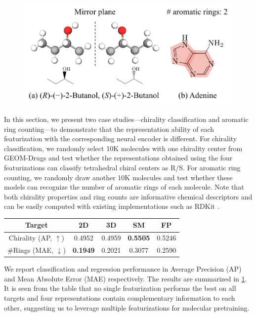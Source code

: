	\setlength{\intextsep}{3pt}
\begin{figure}
	\centering
	\includegraphics[width=\linewidth,bb=0 0 415 201]{figures/case-study.pdf}
\end{figure}
In this section, we present two case studies---chirality classification and aromatic ring counting---to demonstrate that the representation ability of each featurization with the corresponding neural encoder is different.
For chirality classification, we randomly select 10K molecules with one chirality center from GEOM-Drugs \cite{Axelrod:2022da} and test whether the representations obtained using the four featurizations can classify tetrahedral chiral centers as R/S.
For aromatic ring counting, we randomly draw another 10K molecules and test whether these models can recognize the number of aromatic rings of each molecule.
Note that both chirality properties and ring counts are informative chemical descriptors \cite{Ritchie:2009ti} and can be easily computed with existing implementations such as RDKit \cite{Landrum:2022rd}.

\begin{table}
	\begin{tabular}{ccccc}
	\toprule
	Target & 2D & 3D & SM & FP \\
	\midrule
	Chirality (AP, \(\uparrow\)) &   0.4952    &    0.4959   &    \textbf{0.5505}   & 0.5246 \\
	\#Rings (MAE, \(\downarrow\)) &   \textbf{0.1949}    &   0.2021    &   0.3077    & 0.2590 \\
	\bottomrule
	\end{tabular}
	\label{tab:case-studies}
\end{table}
We report classification and regression performance in Average Precision (AP) and Mean Absolute Error (MAE) respectively. The results are summarized in \cref{tab:case-studies}. 
It is seen from the table that no single featurization performs the best on all targets and four representations contain complementary information to each other, suggesting us to leverage multiple featurizations for molecular pretraining.
